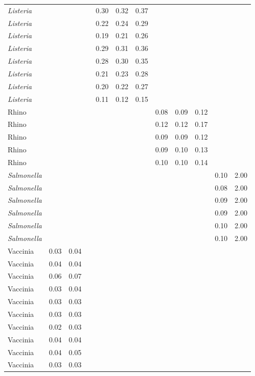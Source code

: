\begin{tabular}{lrrrrrrrrrrr}
  \textit{Listeria} &  &  &  & 0.30 & 0.32 & 0.37 &  &  &  &  &  \\ 
  \textit{Listeria} &  &  &  & 0.22 & 0.24 & 0.29 &  &  &  &  &  \\ 
  \textit{Listeria} &  &  &  & 0.19 & 0.21 & 0.26 &  &  &  &  &  \\ 
  \textit{Listeria} &  &  &  & 0.29 & 0.31 & 0.36 &  &  &  &  &  \\ 
  \textit{Listeria} &  &  &  & 0.28 & 0.30 & 0.35 &  &  &  &  &  \\ 
  \textit{Listeria} &  &  &  & 0.21 & 0.23 & 0.28 &  &  &  &  &  \\ 
  \textit{Listeria} &  &  &  & 0.20 & 0.22 & 0.27 &  &  &  &  &  \\ 
  \textit{Listeria} &  &  &  & 0.11 & 0.12 & 0.15 &  &  &  &  &  \\ 
  Rhino &  &  &  &  &  &  & 0.08 & 0.09 & 0.12 &  &  \\ 
  Rhino &  &  &  &  &  &  & 0.12 & 0.12 & 0.17 &  &  \\ 
  Rhino &  &  &  &  &  &  & 0.09 & 0.09 & 0.12 &  &  \\ 
  Rhino &  &  &  &  &  &  & 0.09 & 0.10 & 0.13 &  &  \\ 
  Rhino &  &  &  &  &  &  & 0.10 & 0.10 & 0.14 &  &  \\ 
  \textit{Salmonella} &  &  &  &  &  &  &  &  &  & 0.10 & 2.00 \\ 
  \textit{Salmonella} &  &  &  &  &  &  &  &  &  & 0.08 & 2.00 \\ 
  \textit{Salmonella} &  &  &  &  &  &  &  &  &  & 0.09 & 2.00 \\ 
  \textit{Salmonella} &  &  &  &  &  &  &  &  &  & 0.09 & 2.00 \\ 
  \textit{Salmonella} &  &  &  &  &  &  &  &  &  & 0.10 & 2.00 \\ 
  \textit{Salmonella} &  &  &  &  &  &  &  &  &  & 0.10 & 2.00 \\ 
  Vaccinia & 0.03 & 0.04 &  &  &  &  &  &  &  &  &  \\ 
  Vaccinia & 0.04 & 0.04 &  &  &  &  &  &  &  &  &  \\ 
  Vaccinia & 0.06 & 0.07 &  &  &  &  &  &  &  &  &  \\ 
  Vaccinia & 0.03 & 0.04 &  &  &  &  &  &  &  &  &  \\ 
  Vaccinia & 0.03 & 0.03 &  &  &  &  &  &  &  &  &  \\ 
  Vaccinia & 0.03 & 0.03 &  &  &  &  &  &  &  &  &  \\ 
  Vaccinia & 0.02 & 0.03 &  &  &  &  &  &  &  &  &  \\ 
  Vaccinia & 0.04 & 0.04 &  &  &  &  &  &  &  &  &  \\ 
  Vaccinia & 0.04 & 0.05 &  &  &  &  &  &  &  &  &  \\ 
  Vaccinia & 0.03 & 0.03 &  &  &  &  &  &  &  &  &  \\ 
   \hline
\end{tabular}

